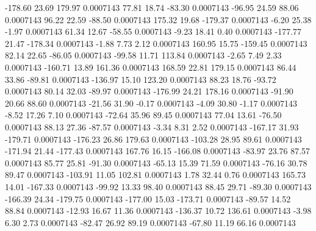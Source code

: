      -178.60       23.69      179.97     0.0007143
       77.81       18.74      -83.30     0.0007143
      -96.95       24.59       88.06     0.0007143
       96.22       22.59      -88.50     0.0007143
      175.32       19.68     -179.37     0.0007143
       -6.20       25.38       -1.97     0.0007143
       61.34       12.67      -58.55     0.0007143
       -9.23       18.41        0.40     0.0007143
     -177.77       21.47     -178.34     0.0007143
       -1.88        7.73        2.12     0.0007143
      160.95       15.75     -159.45     0.0007143
       82.14       22.65      -86.05     0.0007143
      -99.58       11.71      113.84     0.0007143
       -2.65        7.49        2.33     0.0007143
     -160.71       13.89      161.36     0.0007143
      168.59       22.81      179.15     0.0007143
       86.44       33.86      -89.81     0.0007143
     -136.97       15.10      123.20     0.0007143
       88.23       18.76      -93.72     0.0007143
       80.14       32.03      -89.97     0.0007143
     -176.99       24.21      178.16     0.0007143
      -91.90       20.66       88.60     0.0007143
      -21.56       31.90       -0.17     0.0007143
       -4.09       30.80       -1.17     0.0007143
       -8.52       17.26        7.10     0.0007143
      -72.64       35.96       89.45     0.0007143
       77.04       13.61      -76.50     0.0007143
       88.13       27.36      -87.57     0.0007143
       -3.34        8.31        2.52     0.0007143
     -167.17       31.93     -179.71     0.0007143
     -176.23       26.86      179.63     0.0007143
     -103.28       28.95       89.61     0.0007143
     -171.94       21.44     -177.43     0.0007143
      167.76       16.15     -166.08     0.0007143
      -83.97       23.76       87.57     0.0007143
       85.77       25.81      -91.30     0.0007143
      -65.13       15.39       71.59     0.0007143
      -76.16       30.78       89.47     0.0007143
     -103.91       11.05      102.81     0.0007143
        1.78       32.44        0.76     0.0007143
      165.73       14.01     -167.33     0.0007143
      -99.92       13.33       98.40     0.0007143
       88.45       29.71      -89.30     0.0007143
     -166.39       24.34     -179.75     0.0007143
     -177.00       15.03     -173.71     0.0007143
      -89.57       14.52       88.84     0.0007143
      -12.93       16.67       11.36     0.0007143
     -136.37       10.72      136.61     0.0007143
       -3.98        6.30        2.73     0.0007143
      -82.47       26.92       89.19     0.0007143
      -67.80       11.19       66.16     0.0007143
